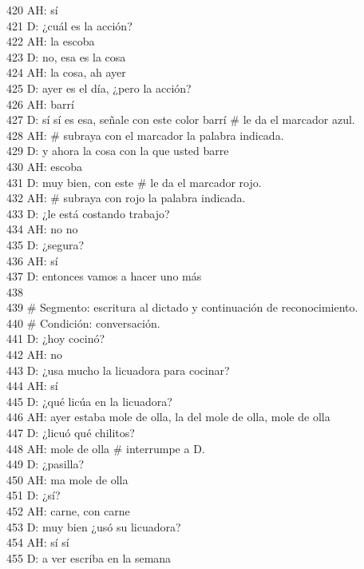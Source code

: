420 AH: sí\\
421 D: ¿cuál es la acción?\\
422 AH: la escoba\\
423 D: no, esa es la cosa\\
424 AH: la cosa, ah ayer\\
425 D: ayer es el día, ¿pero la acción?\\
426 AH: barrí\\
427 D: sí sí es esa, señale con este color barrí \# le da el marcador azul.\\
428 AH: \# subraya con el marcador la palabra indicada.\\
429 D: y ahora la cosa con la que usted barre\\
430 AH: escoba\\
431 D: muy bien, con este \# le da el marcador rojo.\\
432 AH: \# subraya con rojo la palabra indicada.\\
433 D: ¿le está costando trabajo?\\
434 AH: no no\\
435 D: ¿segura?\\
436 AH: sí\\
437 D: entonces vamos a hacer uno más\\
438 \\
439 \# Segmento: escritura al dictado y continuación de reconocimiento.\\
440 \# Condición: conversación.\\
441 D: ¿hoy cocinó?\\
442 AH: no\\
443 D: ¿usa mucho la licuadora para cocinar?\\
444 AH: sí\\
445 D: ¿qué licúa en la licuadora?\\
446 AH: ayer estaba mole de olla, la del mole de olla, mole de olla\\
447 D: ¿licuó qué chilitos?\\
448 AH: mole de olla \# interrumpe a D.\\
449 D: ¿pasilla?\\
450 AH: ma mole de olla\\
451 D: ¿sí?\\
452 AH: carne, con carne\\
453 D: muy bien ¿usó su licuadora?\\
454 AH: sí sí\\
455 D: a ver escriba en la semana\\
